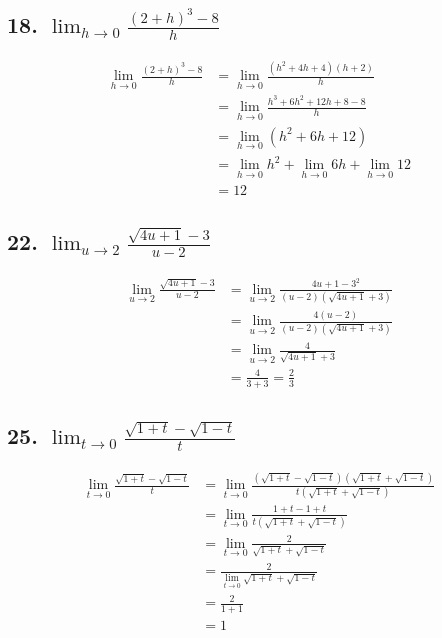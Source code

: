 \documentclass{article}
\begin{document}
    \subsection*{18. $\lim_{h \to 0}\frac{(2 + h)^3 - 8}{h}$}

    $$
    \begin{aligned}
        \lim_{h \to 0}\frac{(2 + h)^3 - 8}{h} &= \lim_{h \to 0}\frac{(h^2 + 4h + 4)(h + 2)}{h} \\
        &= \lim_{h \to 0}\frac{h^3 + 6h^2 + 12h + 8 - 8}{h} \\
        &= \lim_{h \to 0}(h^2 + 6h + 12) \\
        &= \lim_{h \to 0}h^2 + \lim_{h \to 0}6h + \lim_{h \to 0}12 \\
        &= 12
    \end{aligned}
    $$

    \subsection*{22. $\lim_{u \to 2}\frac{\sqrt{4u + 1} - 3}{u - 2}$}
    
    $$
    \begin{aligned}
        \lim_{u \to 2}\frac{\sqrt{4u + 1} - 3}{u - 2} &= \lim_{u \to 2}\frac{4u + 1 - 3^2}{(u - 2)(\sqrt{4u + 1} + 3)} \\
        &= \lim_{u \to 2}\frac{4(u - 2)}{(u - 2)(\sqrt{4u + 1} + 3)} \\
        &= \lim_{u \to 2}\frac{4}{\sqrt{4u + 1} + 3} \\
        &= \frac{4}{3 + 3} = \frac{2}{3}
    \end{aligned}
    $$

    \subsection*{25. $\lim_{t \to 0}\frac{\sqrt{1 + t} - \sqrt{1 - t}}{t}$}

    $$
    \begin{aligned}
        \lim_{t \to 0}\frac{\sqrt{1 + t} - \sqrt{1 - t}}{t} &= \lim_{t \to 0}\frac{(\sqrt{1 + t} - \sqrt{1 - t})(\sqrt{1 + t} + \sqrt{1 - t})}{t(\sqrt{1 + t} + \sqrt{1 - t})} \\
        &= \lim_{t \to 0}\frac{1 + t - 1 + t}{t(\sqrt{1 + t} + \sqrt{1 - t})} \\
        &= \lim_{t \to 0}\frac{2}{\sqrt{1 + t} + \sqrt{1 - t}} \\
        &= \frac{2}{\lim_{t \to 0}{\sqrt{1 + t} + \sqrt{1 - t}}} \\
        &= \frac{2}{1 + 1} \\
        &= 1
    \end{aligned}
    $$
\end{document}
